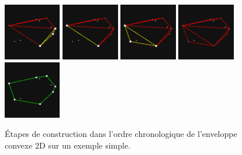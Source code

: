 \documentclass[]{article}
\begin{document}
\begin{figure}[H]
\begin{center}
		\includegraphics[width=2.5cm]{qh2d/demo2d/frame8.png}
		\includegraphics[width=2.5cm]{qh2d/demo2d/frame9.png}
		\includegraphics[width=2.5cm]{qh2d/demo2d/frame10.png}
		\includegraphics[width=2.5cm]{qh2d/demo2d/frame11.png}
		\includegraphics[width=2.5cm]{qh2d/demo2d/frame12.png}
	\end{center}
	\caption{Étapes de construction dans l'ordre chronologique de l'enveloppe convexe 2D sur un exemple simple.}
\end{figure}
\end{document}
